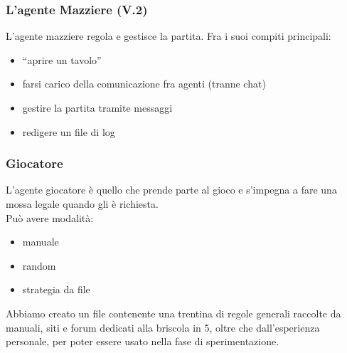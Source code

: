 \documentclass{beamer}
\newcommand*\lista{\item[$\diamondsuit$]}
\begin{document}

\begin{frame}
   \frametitle{L'agente Mazziere (V.2)}
   L'agente mazziere regola e gestisce la partita. Fra i suoi compiti principali:
   \begin{itemize}
      \pause
      \lista ``aprire un tavolo'' 
      \pause
      \lista farsi carico della comunicazione fra agenti (tranne chat)
      \pause
      \lista gestire la partita tramite messaggi
      \pause
      \lista redigere un file di log
   \end{itemize}
\end{frame}


\begin{frame}
   \frametitle{Giocatore}
   L'agente giocatore è quello che prende parte al gioco e s'impegna a fare una mossa legale quando gli è richiesta.\\
   \vfill
   \pause   
   Può avere modalità:
   \begin{itemize}
      \lista manuale
      \lista random
      \lista strategia da file
   \end{itemize}
   \vfill
   \pause
   Abbiamo creato un file contenente una trentina di regole generali raccolte da manuali, siti e forum dedicati alla briscola in 5, oltre che dall'esperienza personale, per poter essere usato nella fase di sperimentazione.
\end{frame}

\end{document}
